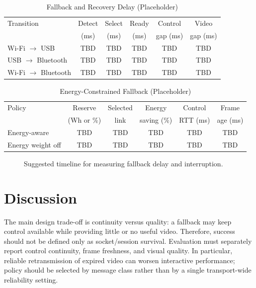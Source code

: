 \documentclass[conference]{IEEEtran}
\begin{document}
\begin{table}[t]
\caption{Fallback and Recovery Delay (Placeholder)}
\label{tab:handover-results}
\centering
\scriptsize
\begin{tabular}{lccccc}
\toprule
Transition & Detect & Select & Ready & Control & Video\\
 & (ms) & (ms) & (ms) & gap (ms) & gap (ms)\\
\midrule
Wi-Fi $\rightarrow$ USB & TBD & TBD & TBD & TBD & TBD\\
USB $\rightarrow$ Bluetooth & TBD & TBD & TBD & TBD & TBD\\
Wi-Fi $\rightarrow$ Bluetooth & TBD & TBD & TBD & TBD & TBD\\
\bottomrule
\end{tabular}
\end{table}

\begin{table}[t]
\caption{Energy-Constrained Fallback (Placeholder)}
\label{tab:energy-fallback-results}
\centering
\scriptsize
\begin{tabular}{lccccc}
\toprule
Policy & Reserve & Selected & Energy & Control & Frame\\
 & (Wh or \%) & link & saving (\%) & RTT (ms) & age (ms)\\
\midrule
Energy-aware & TBD & TBD & TBD & TBD & TBD\\
Energy weight off & TBD & TBD & TBD & TBD & TBD\\
\bottomrule
\end{tabular}
\end{table}

\begin{figure}[t]
\centering
{}
\caption{Suggested timeline for measuring fallback delay and interruption.}
\label{fig:handover}
\end{figure}

\section{Discussion}
The main design trade-off is continuity versus quality: a fallback may keep
control available while providing little or no useful video. Therefore,
success should not be defined only as socket/session survival. Evaluation
must separately report control continuity, frame freshness, and visual
quality. In particular, reliable retransmission of expired video can worsen
interactive performance; policy should be selected by message class rather
than by a single transport-wide reliability setting.
\end{document}
